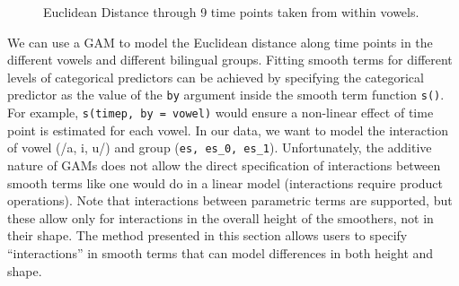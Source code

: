 \documentclass[
  letterpaper,
  DIV=11,
  numbers=noendperiod]{scrartcl}
\begin{document}
\begin{figure}


\caption{\label{fig-dat2}Euclidean Distance through 9 time points taken
from within vowels.}

\end{figure}%

We can use a GAM to model the Euclidean distance along time points in
the different vowels and different bilingual groups. Fitting smooth
terms for different levels of categorical predictors can be achieved by
specifying the categorical predictor as the value of the \texttt{by}
argument inside the smooth term function \texttt{s()}. For example,
\texttt{s(timep,\ by\ =\ vowel)} would ensure a non-linear effect of
time point is estimated for each vowel. In our data, we want to model
the interaction of vowel (/a, i, u/) and group
(\texttt{es,\ es\_0,\ es\_1}). Unfortunately, the additive nature of
GAMs does not allow the direct specification of interactions between
smooth terms like one would do in a linear model (interactions require
product operations). Note that interactions between parametric terms are
supported, but these allow only for interactions in the overall height
of the smoothers, not in their shape. The method presented in this
section allows users to specify ``interactions'' in smooth terms that
can model differences in both height and shape.
\end{document}
